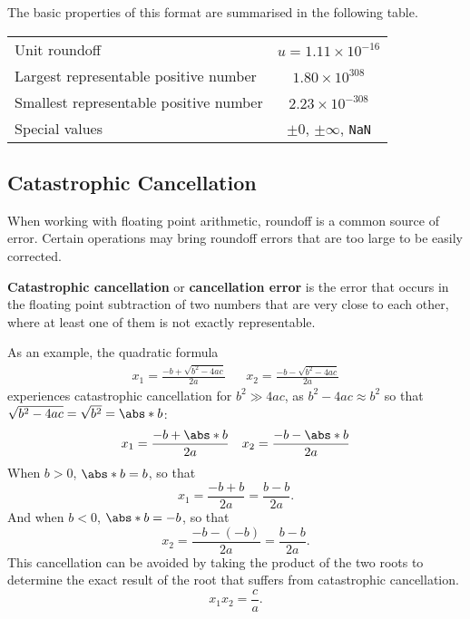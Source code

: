 \documentclass{article}
\begin{document}
The basic properties of this format are summarised in the following table.
\begin{table}[H]
    \centering
    \begin{tabular}{l | c} %
        \toprule
        Unit roundoff                          & \(u = 1.11 \times 10^{-16}\)               \\
        Largest representable positive number  & \(1.80 \times 10^{308}\)                   \\
        Smallest representable positive number & \(2.23 \times 10^{-308}\)                  \\
        Special values                         & \(\pm 0\), \(\pm \infty\), \lstinline!NaN! \\ %
        \bottomrule
    \end{tabular}
\end{table}
\subsection{Catastrophic Cancellation}
When working with floating point arithmetic, roundoff is a common source of error.
Certain operations may bring roundoff errors that are too large to be easily corrected.

\textbf{Catastrophic cancellation} or \textbf{cancellation error} is the error that occurs in the floating
point subtraction of two numbers that are very close to each other, where at least
one of them is not exactly representable.

As an example, the quadratic formula
\begin{align*}
    x_1 = \frac{-b + \sqrt{b^2 - 4 a c}}{2 a} &  & x_2 = \frac{-b - \sqrt{b^2 - 4 a c}}{2 a}
\end{align*}
experiences catastrophic cancellation for \(b^2 \gg 4ac\), as \(b^2 - 4ac \approx b^2\) so that
\(\sqrt{b^2 - 4ac} = \sqrt{b^2} = \abs*{b}\):
\begin{align*}
    x_1 = \frac{-b + \abs*{b}}{2 a} &  & x_2 = \frac{-b - \abs*{b}}{2 a}
\end{align*}
When \(b > 0\), \(\abs*{b} = b\), so that
\begin{equation*}
    x_1 = \frac{-b + b}{2a} = \frac{b - b}{2a}.
\end{equation*}
And when \(b < 0\), \(\abs*{b} = -b\), so that
\begin{equation*}
    x_2 = \frac{-b - \left( -b \right)}{2a} = \frac{b - b}{2a}.
\end{equation*}
This cancellation can be avoided by taking the product of the two roots to determine the exact result
of the root that suffers from catastrophic cancellation.
\begin{equation*}
    x_1 x_2 = \frac{c}{a}.
\end{equation*}
\end{document}
